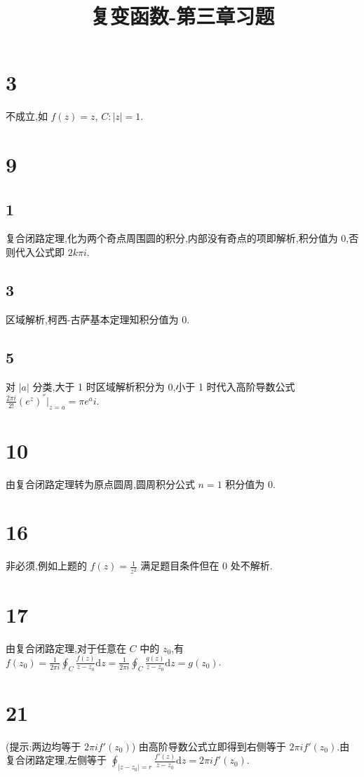 
\usepackage{../../homeworks_preamble}
\title{复变函数-第三章习题}


    \maketitle
    \section{3} 不成立,如 $f(z)=z$, $C:|z|=1$.
    \section{9}
        \subsection{1} 复合闭路定理,化为两个奇点周围圆的积分,内部没有奇点的项即解析,积分值为 0,否则代入公式即 $2k\pi i$.
        \subsection{3} 区域解析,柯西-古萨基本定理知积分值为 0.
        \subsection{5} 对 $|a|$ 分类,大于 1 时区域解析积分为 0,小于 1 时代入高阶导数公式 $\frac{2\pi i}{2!}(e^{z})^{''}\big|_{z=a}=\pi e^{a}i$.
    \section{10} 由复合闭路定理转为原点圆周,圆周积分公式 $n=1$ 积分值为 0.
    \section{16} 非必须,例如上题的 $f(z)=\frac{1}{z^2}$ 满足题目条件但在 0 处不解析.
    \section{17} 由复合闭路定理,对于任意在 $C$ 中的 $z_0$,有 $f(z_0)=\frac{1}{2\pi i}\oint_{C}^{}\frac{f(z)}{z-z_0}\mathrm{d}z=\frac{1}{2\pi i}\oint_{C}^{}\frac{g(z)}{z-z_0}\mathrm{d}z=g(z_0)$.
    \section{21} (提示:两边均等于 $2\pi i f'(z_0)$) 由高阶导数公式立即得到右侧等于 $2\pi if'(z_0)$.由复合闭路定理,左侧等于 $\oint_{|z-z_0|=r}^{}\frac{f'(z)}{z-z_0}\mathrm{d}z=2\pi i f'(z_0)$.
